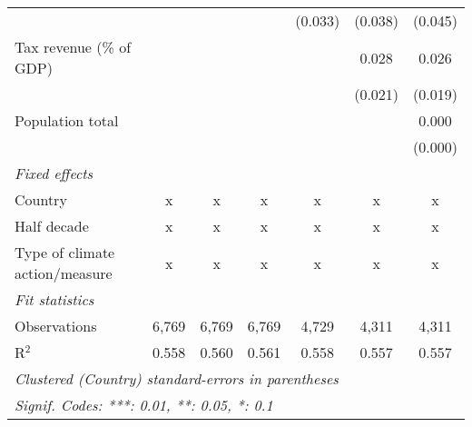 \begin{tabular}{lcccccc}
                                                         &         &                &                & (0.033)        & (0.038)        & (0.045)\\   
   Tax revenue (\% of GDP)                               &         &                &                &                & 0.028          & 0.026\\   
                                                         &         &                &                &                & (0.021)        & (0.019)\\   
   Population total                                      &         &                &                &                &                & 0.000\\   
                                                         &         &                &                &                &                & (0.000)\\   
   \emph{Fixed effects}\\
   Country                                               & x       & x              & x              & x              & x              & x\\  
   Half decade                                           & x       & x              & x              & x              & x              & x\\  
   Type of climate action/measure                        & x       & x              & x              & x              & x              & x\\  
   \midrule \emph{Fit statistics}\\
   Observations                                          & 6,769   & 6,769          & 6,769          & 4,729          & 4,311          & 4,311\\  
   R$^2$                                                 & 0.558   & 0.560          & 0.561          & 0.558          & 0.557          & 0.557\\  
   \midrule
   \multicolumn{7}{l}{\emph{Clustered (Country) standard-errors in parentheses}}\\
   \multicolumn{7}{l}{\emph{Signif. Codes: ***: 0.01, **: 0.05, *: 0.1}}\\
\end{tabular}
\par\endgroup


